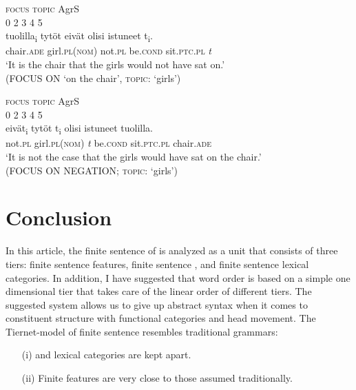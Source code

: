 \documentclass[output=paper]{langsci/langscibook}
\begin{document}
  \ex\label{ex:nikanne:26c}
  \gllll  \textsc{focus}           \textsc{topic}              AgrS\\
	  0     2   3                     4  5\\
  tuolilla\textsubscript{i}  tytöt   eivät   olisi   istuneet   t\textsubscript{i}.\\
  chair.\textsc{ade}  girl.\textsc{pl}(\textsc{nom}) not.\textsc{pl} be.\textsc{cond} sit.\textsc{ptc}.\textsc{pl} \textit{t}\\
  \glt ‘It is the chair that the girls would not have sat on.’ \\
  (FOCUS ON ‘on the chair’, \textsc{topic}: ‘girls’)

  \ex\label{ex:nikanne:26d}
  \gllll \textsc{focus}           \textsc{topic}              AgrS {} {} {}\\
    0     2   3                     4  5 {}\\
     eivät\textsubscript{i}  tytöt     t\textsubscript{i}  olisi   istuneet   tuolilla.\\
    not.\textsc{pl}  girl.\textsc{pl}(\textsc{nom})  \textit{t}   be.\textsc{cond}   sit.\textsc{ptc}.\textsc{pl} chair.\textsc{ade}\\
  \glt ‘It is not the case that the girls would have sat on the chair.’ \\
  (FOCUS ON NEGATION; \textsc{topic}: ‘girls’)
  \z
\z

\section{Conclusion} %

In this article, the finite sentence of  is analyzed as a unit that consists of three tiers: finite sentence features, finite sentence , and finite sentence lexical categories. In addition, I have suggested that word order is based on a simple one dimensional tier that takes care of the linear order of different tiers.  The suggested system allows us to give up abstract syntax when it comes to constituent structure with functional categories and head movement. The Tiernet-model of finite sentence resembles traditional grammars: 

\begin{enumerate}
 \item[(i)]  and lexical categories are kept apart.
 \item[(ii)] Finite features are very close to those assumed traditionally.
\end{enumerate}
\end{document}

